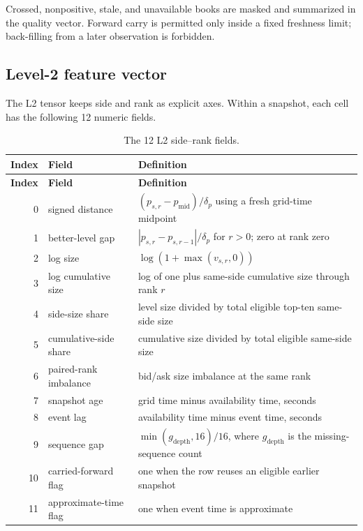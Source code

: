 \documentclass[10pt,letterpaper]{article}
\numberwithin{equation}{section}
\theoremstyle{definition}
\theoremstyle{remark}
\begin{document}
Crossed, nonpositive, stale, and unavailable books are masked and summarized in
the quality vector. Forward carry is permitted only inside a fixed freshness
limit; back-filling from a later observation is forbidden.

\subsection{Level-2 feature vector}

The L2 tensor keeps side and rank as explicit axes. Within a snapshot, each
cell has the following 12 numeric fields.

\begin{longtable}{@{}r p{4.2cm} p{10.0cm}@{}}
\caption{The 12 L2 side--rank fields.}\label{tab:l2-fields}\\
\toprule
\textbf{Index} & \textbf{Field} & \textbf{Definition}\\
\midrule
\endfirsthead
\toprule
\textbf{Index} & \textbf{Field} & \textbf{Definition}\\
\midrule
\endhead
0 & signed distance & $(p_{s,r}-p_{\mathrm{mid}})/\delta_p$ using a fresh grid-time midpoint\\
1 & better-level gap & \(|p_{s,r}-p_{s,r-1}|/\delta_p\) for \(r>0\); zero at rank zero\\
2 & log size & $\log(1+\max(v_{s,r},0))$\\
3 & log cumulative size & log of one plus same-side cumulative size through rank $r$\\
4 & side-size share & level size divided by total eligible top-ten same-side size\\
5 & cumulative-side share & cumulative size divided by total eligible same-side size\\
6 & paired-rank imbalance & bid/ask size imbalance at the same rank\\
7 & snapshot age & grid time minus availability time, seconds\\
8 & event lag & availability time minus event time, seconds\\
9 & sequence gap & \(\min(g_{\mathrm{depth}},16)/16\), where \(g_{\mathrm{depth}}\) is the missing-sequence count\\
10 & carried-forward flag & one when the row reuses an eligible earlier snapshot\\
11 & approximate-time flag & one when event time is approximate\\
\bottomrule
\end{longtable}
\end{document}
